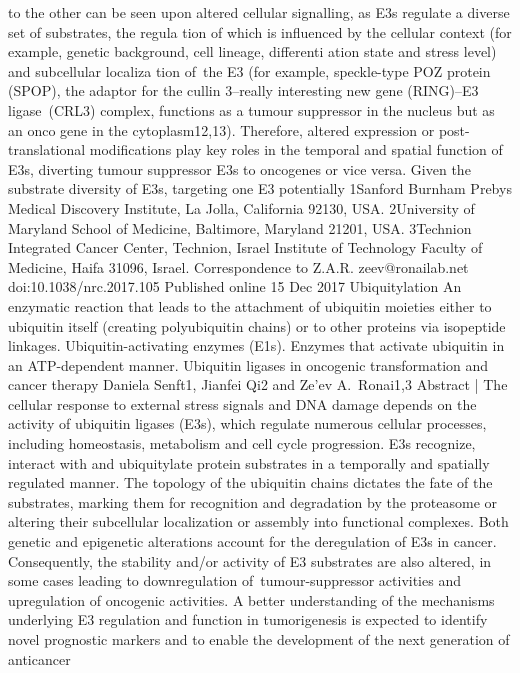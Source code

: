 to the other can be seen upon altered cellular signalling,
as E3s regulate a diverse set of substrates, the regula­
tion of which is influenced by the cellular context (for
example, genetic background, cell lineage, differenti­
ation state and stress level) and subcellular localiza­
tion of the E3 (for example, speckle-type POZ protein
(SPOP), the adaptor for the cullin 3–really interesting
new gene (RING)–E3 ligase (CRL3) complex, functions
as a tumour suppressor in the nucleus but as an onco­
gene in the cytoplasm12,13). Therefore, altered expression
or post-translational modifications play key roles in the
temporal and spatial function of E3s, diverting tumour
suppressor E3s to oncogenes or vice versa. Given the
substrate diversity of E3s, targeting one E3 potentially
1Sanford Burnham Prebys
Medical Discovery Institute,
La Jolla, California 92130,
USA.
2University of Maryland
School of Medicine,
Baltimore, Maryland 21201,
USA.
3Technion Integrated Cancer
Center, Technion, Israel
Institute of Technology
Faculty of Medicine, Haifa
31096, Israel.
Correspondence to Z.A.R.
zeev@ronailab.net
doi:10.1038/nrc.2017.105
Published online 15 Dec 2017
Ubiquitylation
An enzymatic reaction that
leads to the attachment of
ubiquitin moieties either to
ubiquitin itself (creating
polyubiquitin chains) or to
other proteins via isopeptide
linkages.
Ubiquitin-activating
enzymes
(E1s). Enzymes that activate
ubiquitin in an ATP-dependent
manner.
Ubiquitin ligases in oncogenic
transformation and cancer therapy
Daniela Senft1, Jianfei Qi2 and Ze'ev A. Ronai1,3
Abstract | The cellular response to external stress signals and DNA damage depends on the activity
of ubiquitin ligases (E3s), which regulate numerous cellular processes, including homeostasis,
metabolism and cell cycle progression. E3s recognize, interact with and ubiquitylate protein
substrates in a temporally and spatially regulated manner. The topology of the ubiquitin chains
dictates the fate of the substrates, marking them for recognition and degradation by the
proteasome or altering their subcellular localization or assembly into functional complexes. Both
genetic and epigenetic alterations account for the deregulation of E3s in cancer. Consequently, the
stability and/or activity of E3 substrates are also altered, in some cases leading to downregulation
of tumour-suppressor activities and upregulation of oncogenic activities. A better understanding of
the mechanisms underlying E3 regulation and function in tumorigenesis is expected to identify
novel prognostic markers and to enable the development of the next generation of anticancer
